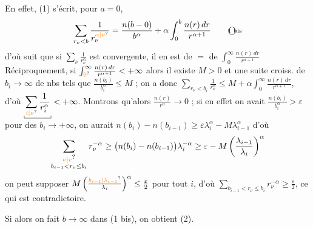 En effet, (1) s'écrit, pour $a=0$, 
\[ \sum_{r_\nu<b}\frac1{r_\nu^{\unsure{\alpha|\nu}}}=\frac{n(b-0)}{b^\alpha}+\alpha\int_0^b\frac{n(r)\,dr}{r^{\alpha+1}}\tag*{\textcircled{\scriptsize 1 bis}} \]
d'où suit que si  $\sum_\nu\frac1{r_\nu^\alpha}$ est
convergente, il en est de $=$ de $\int_0^\infty\frac{n(r)\,dr}{r^{\alpha+1}}$
Réciproquement, si $\int_{\unsure{0}}^\infty\frac{n(r)\,dr}{r^{\alpha+1}}<+\infty$ alors il
existe $M>0$ et une suite croiss. de $b_i\to\infty$
de nbs tels que $\frac{n(b_i)}{b_i^\alpha}\leq M$ ;  on a donc
$\displaystyle \sum_{r_\nu<b_i}\frac1{r_\nu^\alpha}\leq M+\alpha\int_0^\infty\frac{n(r)\,dr}{r^{\alpha+1}}$, d'où $\displaystyle \tikz[baseline=(a.base)]{\node[inner sep=1pt] (a) {$\displaystyle\sum_{\unsure{i|\nu}}\frac1{r_i^\alpha}$};\draw ([yshift=3pt]a.south west)--(a.south west)--(a.south east)--([yshift=3pt]a.south east);}<+\infty$.
Montrons qu'alors $\frac{n(r)}{r^\alpha}\to0$ ; si en effet on avait
$\frac{n(b_i)}{b_i^\alpha}>\varepsilon$ pour des $b_i\to+\infty$, on aurait
$n(b_i)-n(b_{i-1})\geq\varepsilon\lambda_i^\alpha-M\lambda_{i-1}^\alpha$ d'où
\[ \sum_{\substack{\unsure{\nu|v}\\b_{i-1}<r_\nu\leq b_i}}r_\nu^{-\alpha}\geq\big(n(b_i)-n(b_{i-1})\big)\lambda_i^{-\alpha}\geq\varepsilon-M\left(\frac{\lambda_{i-1}}{\lambda_i}\right)^\alpha \]
on peut supposer $M\left(\frac{\unsure{b_{i-1}|\lambda_{i-1}}}{\lambda_i}\right)^\alpha\leq\frac{\varepsilon}{2}$ pour tout $i$,
d'où $\sum_{b_{i-1}<r_\nu\leq b_i}r_\nu^{-\alpha}\geq\frac{\varepsilon}{2}$,  ce
qui est contradictoire.

Si alors on fait $b\to\infty$ dans (1 bis), on
obtient (2).

